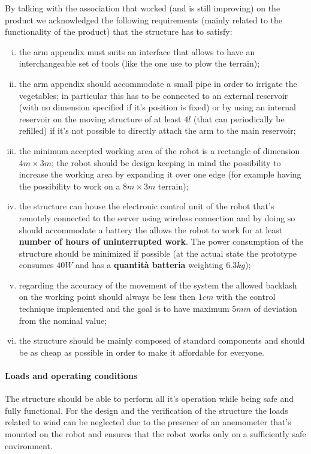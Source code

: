 	By talking with the association that worked (and is still improving) on the product we acknowledged the following requirements (mainly related to the functionality of the product) that the structure has to satisfy:
	\begin{enumerate}[i)]
		\item the arm appendix must suits an interface that allows to have an interchangeable set of tools (like the one use to plow the terrain);
		
		\item the arm appendix should accommodate a small pipe in order to irrigate the vegetables; in particular this has to be connected to an external reservoir (with no dimension specified if it's position is fixed) or by using an internal reservoir on the moving structure of at least $4l$ (that can periodically be refilled) if it's not possible to directly attach the arm to the main reservoir;
		
		\item the minimum accepted working area of the robot is a rectangle of dimension $4m\times 3m$; the robot should be design keeping in mind the possibility to increase the working area by expanding it over one edge (for example having the possibility to work on a $8m\times 3m$ terrain);
		
		\item the structure can house the electronic control unit of the robot that's remotely connected to the server using wireless connection and by doing so should accommodate a battery the allows the robot to work for at least \textbf{number of hours of uninterrupted work}. The power consumption of the structure should be minimized if possible (at the actual state the prototype consumes $40W$ and has a \textbf{quantità batteria} weighting $6.3kg$);
		
		\item regarding the accuracy of the movement of the system the allowed backlash on the working point should always be less then $1cm$ with the control technique implemented and the goal is to have maximum $5mm$ of deviation from the nominal value;
		
		\item the structure should be mainly composed of standard components and should be as cheap as possible in order to make it affordable for everyone.
	\end{enumerate}

	\paragraph{Loads and operating conditions} The structure should be able to perform all it's operation while being safe and fully functional. For the design and the verification of the structure the loads related to wind can be neglected due to the presence of an anemometer that's mounted on the robot and ensures that the robot works only on a sufficiently safe environment.
	
